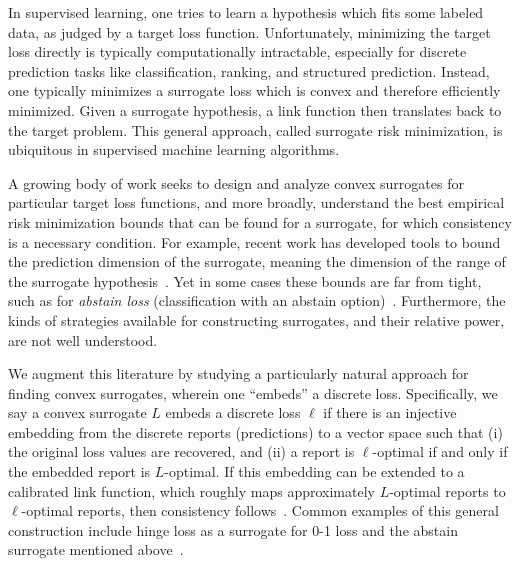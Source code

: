 \documentclass[11pt]{article}
\begin{document}
In supervised learning, one tries to learn a hypothesis which fits some labeled data, as judged by a target loss function.
Unfortunately, minimizing the target loss directly is typically computationally intractable, especially for discrete prediction tasks like classification, ranking, and structured prediction.
Instead, one typically minimizes a surrogate loss which is convex and therefore efficiently minimized.
Given a surrogate hypothesis, a link function then translates back to the target problem.
This general approach, called surrogate risk minimization, is ubiquitous in supervised machine learning algorithms.

A growing body of work seeks to design and analyze convex surrogates for particular target loss functions, and more broadly, understand the best empirical risk minimization bounds that can be found for a surrogate, for which consistency is a necessary condition.
For example, recent work has developed tools to bound the prediction dimension of the surrogate, meaning the dimension of the range of the surrogate hypothesis~\citep{frongillo2015elicitation,  ramaswamy2016convex}.
Yet in some cases these bounds are far from tight, such as for \emph{abstain loss} (classification with an abstain option)~\citep{bartlett2008classification,yuan2010classification,ramaswamy2016convex,ramaswamy2018consistent,zhang2018reject}.
Furthermore, the kinds of strategies available for constructing surrogates, and their relative power, are not well understood.

We augment this literature by studying a particularly natural approach for finding convex surrogates, wherein one ``embeds'' a discrete loss.
Specifically, we say a convex surrogate $L$ embeds a discrete loss $\ell$ if there is an injective embedding from the discrete reports (predictions) to a vector space such that (i) the original loss values are recovered, and (ii) a report is $\ell$-optimal if and only if the embedded report is $L$-optimal.
If this embedding can be extended to a calibrated link function, which roughly maps approximately $L$-optimal reports to $\ell$-optimal reports, then consistency follows~\citep{agarwal2015consistent}.
Common examples of this general construction include hinge loss as a surrogate for 0-1 loss and the abstain surrogate mentioned above~\citep{ramaswamy2018consistent}.


\end{document}

